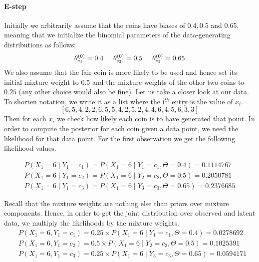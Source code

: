 \paragraph{E-step} Initially we arbitrarily assume that the coins have biases of $ 0.4, 0.5  $ and $ 0.65 $, meaning that we initialize the binomial parameters of the data-generating
distributions as follows:
\begin{equation}
\theta^{(0)}_{c_{1}} = 0.4 \hskip 0.5cm  \theta^{(0)}_{c_{2}} = 0.5 \hskip 0.5cm  \theta^{(0)}_{c_{3}} = 0.65
\end{equation}
We also assume that the fair coin is more likely to be used and hence set its initial mixture weight to $ 0.5 $ and the mixture weights of the 
other two coins to $ 0.25 $ (any other choice would also be fine). Let 
us take a closer look at our data. To shorten notation, we write it as a list where the i$ ^{th} $ entry is the value of $ x_{i} $.
$$ \left[ 6, 5, 4, 2, 2, 6, 5, 5, 4, 2, 5, 2, 4, 4, 6, 4, 5, 6, 3, 3 \right] $$ 
Then for each $ x_{i} $ we check how likely each coin is to have generated that point. In order to compute the posterior for each coin given a data point, we need
the likelihood for that data point. For the first observation we get the following likelihood values.


\begin{align}
&P(X_{1}=6 \mid Y_{1} = c_{1}) = P(X_{1}=6 \mid Y_{1}=c_{1},\Theta = 0.4) = 0.1114767& \\
&P(X_{1}=6 \mid Y_{1} = c_{2}) = P(X_{1}=6 \mid Y_{2}=c_{2},\Theta = 0.5) = 0.2050781& \nonumber \\ 
&P(X_{1}=6 \mid Y_{1} = c_{3}) = P(X_{1}=6 \mid Y_{3}=c_{3},\Theta = 0.65) = 0.2376685& \nonumber
\end{align}

Recall that the mixture weights are nothing else than priors over mixture components. Hence, in order to get the joint distribution over observed and
latent data, we multiply the likelihoods by the mixture weights.
\begin{align}
&P(X_{1}=6,Y_{1} = c_{1}) = 0.25 \times P(X_{1}=6 \mid Y_{1}=c_{1},\Theta = 0.4) = 0.0278692 \\
&P(X_{1}=6,Y_{1} = c_{2}) = 0.5 \times P(X_{1}=6 \mid Y_{2}=c_{2},\Theta = 0.5) = 0.1025391 \nonumber \\ 
&P(X_{1}=6,Y_{1} = c_{3}) = 0.25 \times P(X_{1}=6 \mid Y_{3}=c_{3},\Theta = 0.65) = 0.0594171 \nonumber
\end{align}

